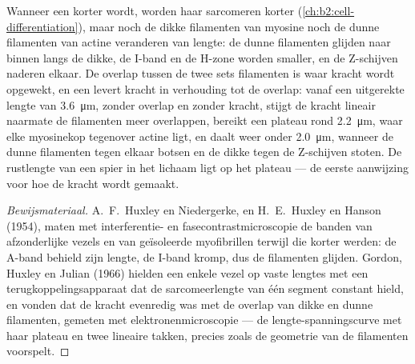 \begin{proposition}\label{prop:b2:muscle-movement:sliding}
Wanneer een  korter wordt, worden haar sarcomeren korter
(\cref{ch:b2:cell-differentiation}), maar noch de dikke filamenten van
myosine noch de dunne filamenten van actine veranderen van lengte: de dunne
filamenten glijden naar binnen langs de dikke, de I-band en de H-zone worden
smaller, en de Z-schijven naderen elkaar. De overlap tussen de twee sets
filamenten is waar kracht wordt opgewekt, en een  levert kracht
in verhouding tot de overlap: vanaf een uitgerekte lengte van
\qty{3.6}{\micro m}, zonder overlap en zonder kracht, stijgt de kracht
lineair naarmate de filamenten meer overlappen, bereikt een plateau rond
\qty{2.2}{\micro m}, waar elke myosinekop tegenover actine ligt, en daalt
weer onder \qty{2.0}{\micro m}, wanneer de dunne filamenten tegen elkaar
botsen en de dikke tegen de Z-schijven stoten. De rustlengte van een spier
in het lichaam ligt op het plateau --- de eerste aanwijzing voor hoe de
kracht wordt gemaakt.
\end{proposition}
\begin{proof}[Bewijsmateriaal]
A.~F.~Huxley en Niedergerke, en H.~E.~Huxley en Hanson (1954), maten met
interferentie- en fasecontrastmicroscopie de banden van afzonderlijke vezels
en van geïsoleerde myofibrillen terwijl die korter werden: de A-band behield
zijn lengte, de I-band kromp, dus de filamenten glijden. Gordon, Huxley en
Julian (1966) hielden een enkele vezel op vaste lengtes met een
terugkoppelingsapparaat dat de sarcomeerlengte van één segment constant hield,
en vonden dat de kracht evenredig was met de overlap van dikke en dunne
filamenten, gemeten met elektronenmicroscopie --- de lengte-spanningscurve
met haar plateau en twee lineaire takken, precies zoals de geometrie van de
filamenten voorspelt.
\end{proof}

